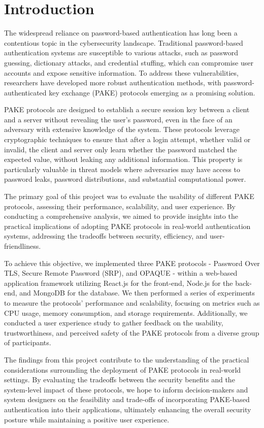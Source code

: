 \section{Introduction}
\label{sec:intro}

The widespread reliance on password-based authentication has long been a contentious topic in the cybersecurity landscape. Traditional password-based authentication systems are susceptible to various attacks, such as password guessing, dictionary attacks, and credential stuffing, which can compromise user accounts and expose sensitive information. To address these vulnerabilities, researchers have developed more robust authentication methods, with password-authenticated key exchange (PAKE) protocols emerging as a promising solution.

PAKE protocols are designed to establish a secure session key between a client and a server without revealing the user's password, even in the face of an adversary with extensive knowledge of the system. These protocols leverage cryptographic techniques to ensure that after a login attempt, whether valid or invalid, the client and server only learn whether the password matched the expected value, without leaking any additional information. This property is particularly valuable in threat models where adversaries may have access to password leaks, password distributions, and substantial computational power.

The primary goal of this project was to evaluate the usability of different PAKE protocols, assessing their performance, scalability, and user experience. By conducting a comprehensive analysis, we aimed to provide insights into the practical implications of adopting PAKE protocols in real-world authentication systems, addressing the tradeoffs between security, efficiency, and user-friendliness.

To achieve this objective, we implemented three PAKE protocols - Password Over TLS, Secure Remote Password (SRP), and OPAQUE - within a web-based application framework utilizing React.js for the front-end, Node.js for the back-end, and MongoDB for the database. We then performed a series of experiments to measure the protocols' performance and scalability, focusing on metrics such as CPU usage, memory consumption, and storage requirements. Additionally, we conducted a user experience study to gather feedback on the usability, trustworthiness, and perceived safety of the PAKE protocols from a diverse group of participants.

The findings from this project contribute to the understanding of the practical considerations surrounding the deployment of PAKE protocols in real-world settings. By evaluating the tradeoffs between the security benefits and the system-level impact of these protocols, we hope to inform decision-makers and system designers on the feasibility and trade-offs of incorporating PAKE-based authentication into their applications, ultimately enhancing the overall security posture while maintaining a positive user experience.